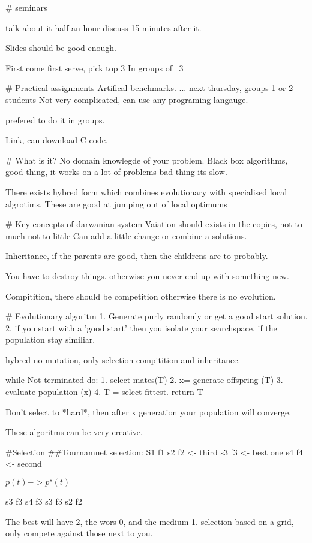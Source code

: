 # seminars

talk about it half an hour
discuss 15 minutes after it.

Slides should be good enough.

First come first serve, pick top 3
In groups of ~3

# Practical assignments
Artifical benchmarks.
... next thursday, groups 1 or 2 students
Not very complicated, can use any programing langauge.

prefered to do it in groups.

Link, can download C code.


# What is it?
No domain knowlegde of your problem.
Black box algorithms,
	good thing, it works on a lot of problems
	bad thing its slow.

There exists hybred form which combines evolutionary
with specialised local algrotims.
	These are good at jumping out of local optimums

# Key concepts of darwanian system
Vaiation should exists in the copies, not to much not to little
Can add a little change or combine a solutions.

Inheritance, if the parents are good, then the childrens are to probably.

You have to destroy things. otherwise you never end up with something new.

Compitition, there should be competition otherwise there is no evolution.

# Evolutionary algoritm
1. Generate purly randomly or get a good start solution.
2. if you start with a 'good start' then you isolate your searchspace. if the
population stay similiar.

hybred no mutation, only selection compitition and inheritance.

while Not terminated do:
	1. select mates(T)
	2. x= generate offspring (T)
	3. evaluate population (x)
	4. T = select fittest.
return T

Don't select to *hard*, then after x generation your population will converge.

These algoritms can be very creative.

#Selection
##Tournamnet selection:
	S1 f1
	s2 f2 <- third
	s3 f3 <- best one
	s4 f4 <- second

	$p(t) -> p^s(t)$

	s3 f3
	s4 f3
	s3 f3
	s2 f2

The best will have 2, the wors 0, and the medium 1.
selection based on a grid, only compete against those next to you.

